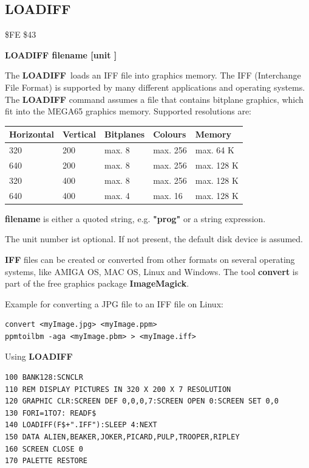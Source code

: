 \subsection{LOADIFF}
\begin{description}[leftmargin=2cm,style=nextline]
\item [Token:] \$FE \$43
\item [Format:] {\bf LOADIFF filename [unit ]}
\item [Usage:]

   The {\bf LOADIFF} loads an IFF file into graphics memory.
   The IFF (Interchange File Format) is supported by many different applications
   and operating systems. The {\bf LOADIFF} command assumes a file
   that contains bitplane graphics, which fit into the MEGA65 graphics memory.
   Supported resolutions are:

{\ttfamily
\setlength{\tabcolsep}{1mm}
\begin{tabular}{|l|l|l|l|l|}
\hline
 Horizontal             & Vertical & Bitplanes & Colours & Memory \\
\hline
320                     &  200    & max. 8     & max. 256 & max. 64 K \\
640                     &  200    & max. 8     & max. 256 & max. 128 K \\
320                     &  400    & max. 8     & max. 256 & max. 128 K \\
640                     &  400    & max. 4     & max.  16 & max. 128 K \\
\hline
\end{tabular}
}

   {\bf filename} is either a quoted string, e.g. {\bf "prog"} or
   a string expression.

   The unit number ist optional.
   If not present, the default disk device is assumed.

\item [Remarks:]
   {\bf IFF} files can be created or converted from other formats on
   several operating systems, like AMIGA OS, MAC OS, Linux and Windows.
   The tool {\bf convert} is part of the free graphics package {\bf ImageMagick}.

Example for converting a JPG file to an IFF file on Linux:

\begin{verbatim}
convert <myImage.jpg> <myImage.ppm>
ppmtoilbm -aga <myImage.pbm> > <myImage.iff>
\end{verbatim}

\item [Example:] Using {\bf LOADIFF}
\begin{tcolorbox}[colback=black,coltext=white]
\verbatimfont{\codefont}
\begin{verbatim}
100 BANK128:SCNCLR
110 REM DISPLAY PICTURES IN 320 X 200 X 7 RESOLUTION
120 GRAPHIC CLR:SCREEN DEF 0,0,0,7:SCREEN OPEN 0:SCREEN SET 0,0
130 FORI=1TO7: READF$
140 LOADIFF(F$+".IFF"):SLEEP 4:NEXT
150 DATA ALIEN,BEAKER,JOKER,PICARD,PULP,TROOPER,RIPLEY
160 SCREEN CLOSE 0
170 PALETTE RESTORE
\end{verbatim}
\end{tcolorbox}
\end{description}

